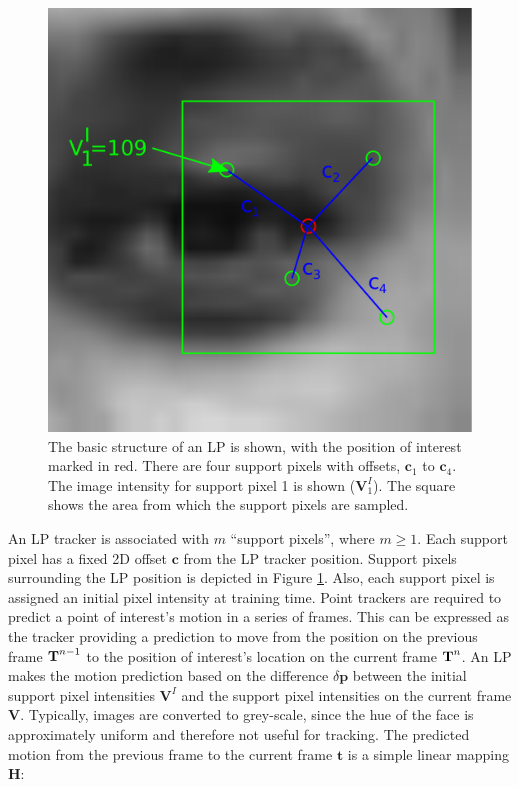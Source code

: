 \begin{appendices}
\def\supportOffset{\textbf{c}}
\def\numSupportPixels{m}
\def\imageIntensityDifference{\delta \textbf{p}}
\def\imageIntensity{\textbf{V}}
\def\predictedMotion{\textbf{t}}
\def\numTrainingOffsets{h}
\def\lpTrainingIntensity{\textbf{T}}
\def\lpTrainOffsets{\delta \textbf{P}}
\def\linearPredictorMapping{\textbf{H}}
\def\numShapeComponents{r}

\begin{figure}[tb]
\centering
\includegraphics[width = 0.5 \columnwidth]{litreview/lptracker.pdf}
\caption[The basic structure of an LP is shown, with the position of interest marked in red.]{The basic structure of an LP is shown, with the position of interest marked in red. There are four support pixels with offsets, $\supportOffset_1$ to $\supportOffset_4$. The image intensity for support pixel 1 is shown ($\imageIntensity^I_1$). The square shows the area from which the support pixels are sampled.}
\label{FigureLinearPredictorTrain}
\end{figure}

An \ac{LP} tracker is associated with $\numSupportPixels$ ``support pixels'', where $\numSupportPixels \geq 1$. Each support pixel has a fixed 2{D} offset $\supportOffset$ from the \ac{LP} tracker position. Support pixels surrounding the \ac{LP} position is depicted in Figure \ref{FigureLinearPredictorTrain}. Also, each support pixel is assigned an initial pixel intensity at training time. Point trackers are required to predict a point of interest's motion in a series of frames. This can be expressed as the tracker providing a prediction to move from the position on the previous frame $\textbf{T}^{n-1}$ to the position of interest's location on the current frame $\textbf{T}^{n}$. An \ac{LP} makes the motion prediction based on the difference $\imageIntensityDifference$ between the initial support pixel intensities $\imageIntensity^I$ and the support pixel intensities on the current frame $\imageIntensity$. Typically, images are converted to grey-scale, since the hue of the face is approximately uniform and therefore not useful for tracking. The predicted motion from the previous frame to the current frame $\predictedMotion$ is a simple linear mapping $\linearPredictorMapping$:


\end{appendices}
